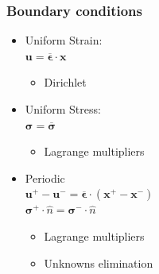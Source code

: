 \documentclass[usenames,dvipsnames]{beamer}
\begin{document}

\begin{frame}
\frametitle{Boundary conditions}

\begin{minipage}[h]{0.49\linewidth}
\begin{itemize}
\item Uniform Strain: \\ $\bm{u} = \overline{\bm{\epsilon}} \cdot \bm{x} $
  \begin{itemize}
  \item Dirichlet
  \end{itemize}
  \vspace{0.5cm}
\item Uniform Stress: \\$ \bm{\sigma} = \overline{\bm{\sigma}} $
  \begin{itemize}
  \item Lagrange multipliers
  \end{itemize}
  \vspace{0.5cm}
\item Periodic \\
$ \bm{u}^+ - \bm{u}^- = \overline{\bm{\epsilon}} \cdot (\bm{x}^+ - \bm{x}^-) $\\
$ \bm{\sigma}^+ \cdot \hat{n}  = \bm{\sigma}^- \cdot \hat{n}$
  \begin{itemize}
  \item Lagrange multipliers
  \item Unknowns elimination
  \end{itemize}
\end{itemize}
\end{minipage}
\begin{minipage}[h]{0.49\linewidth}
\resizebox{0.8\linewidth}{!}{}
\end{minipage}

\end{frame}

\end{document}
